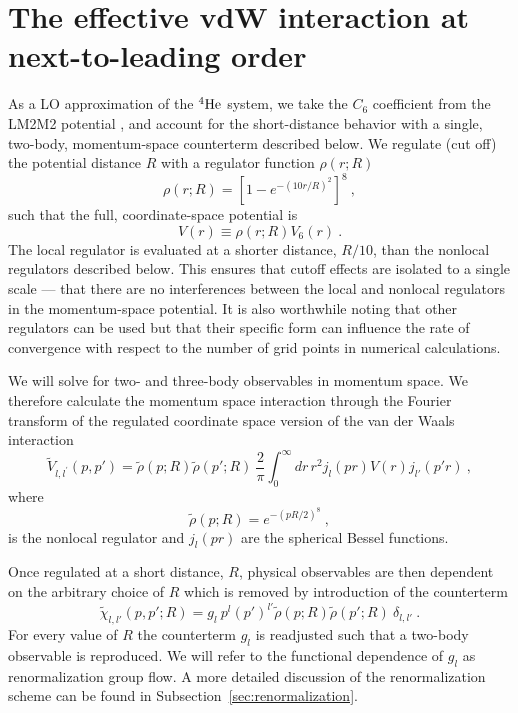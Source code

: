 \documentclass[aps,preprint,superscriptaddress]{revtex4-1}
\begin{document}
\section{The effective vdW interaction at next-to-leading order}
\label{sec:numer-impl}
As a LO approximation of the ${}^4\rm{He}$ system, we take the $C_6$
coefficient from the LM2M2 potential \cite{doi:10.1063/1.460139}, and
account for the short-distance behavior with a single, two-body,
momentum-space counterterm described below. We regulate (cut off) the
potential distance $R$ with a regulator function $\rho(r;R)$
\begin{equation}
  \label{eq:rho}
  \rho(r;R) = {\left[1 - e^{-{(10r/R)}^2}\right]}^8~,
\end{equation}
such that the full, coordinate-space potential is
\begin{equation}
  \label{eq:coordinate_potential}
  V(r)\equiv \rho(r;R) V_6(r)~.
\end{equation}
The local regulator is evaluated at a shorter distance, $R/10$, than the
nonlocal regulators described below.
This ensures that cutoff effects are isolated to a single scale --- that there
are no interferences between the local and nonlocal regulators in the
momentum-space potential.
It is also worthwhile noting that other regulators can be used but that their
specific form can influence the rate of convergence with respect to the number
of grid points in numerical calculations.

We will solve for two- and three-body observables in momentum
space. We therefore calculate the momentum space interaction through
the Fourier transform of the regulated coordinate space version of the
van der Waals interaction
\begin{equation}
  \label{eq:momV}
  \tilde{V}_{l,l^\prime}(p,p') = \tilde{\rho}(p;R) \tilde{\rho}(p';R)~ \frac{2}{\pi} \int_0^\infty dr\,r^2 j_l(pr)
  V(r) j_{l'}(p'r)~,
\end{equation}
where
\begin{equation}
  \label{eq:nonlocal_regulator}
  \tilde{\rho}(p;R) = e^{-(pR/2)^8}~,
\end{equation}
is the nonlocal regulator and $j_l(pr)$ are the spherical Bessel functions.

Once regulated at a short distance, $R$, physical observables are then
dependent on the arbitrary choice of $R$ which is removed by
introduction of the counterterm
\begin{equation}
  \label{eq:mom_space_xterm}
  \tilde{\chi}_{l,l'}(p,p';R) = g_l~ p^l (p')^{l'} \tilde{\rho}(p;R) \tilde{\rho}(p';R) ~\delta_{l,l'}~.
\end{equation}
For every value of $R$ the counterterm $g_l$ is readjusted such that a
two-body observable is reproduced. We will refer to the functional
dependence of $g_l$ as renormalization group flow.
A more detailed discussion of the renormalization scheme can be found in
Subsection~\ref{sec:renormalization}.
\end{document}
